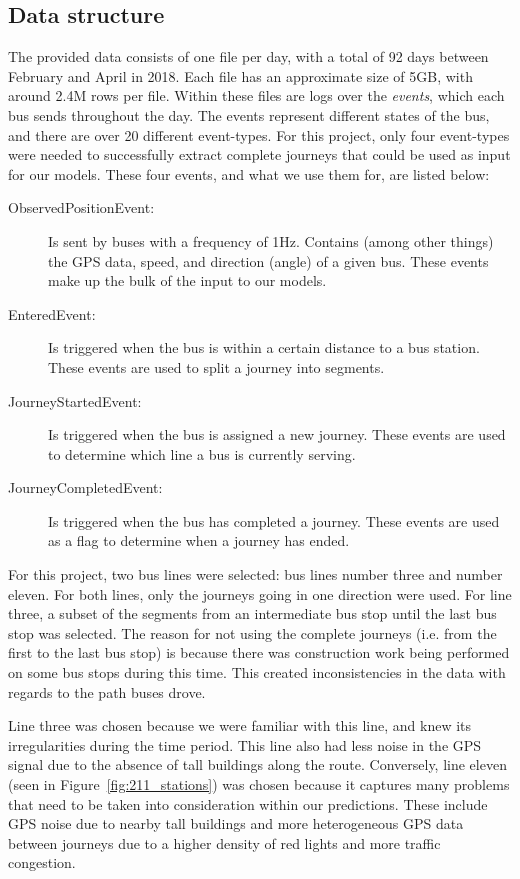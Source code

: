 \subsection{Data structure}
The provided data consists of one file per day, with a total of 92 days between February and April in 2018. Each file has an approximate size of 5GB, with around 2.4M rows per file. Within these files are logs over the \textit{events}, which each bus sends throughout the day. The events represent different states of the bus, and there are over 20 different event-types. For this project, only four event-types were needed to successfully extract complete journeys that could be used as input for our models. These four events, and what we use them for, are listed below:\\
\begin{description}
\item[ObservedPositionEvent:] Is sent by buses with a frequency of 1Hz. Contains (among other things) the GPS data, speed, and direction (angle) of a given bus. These events make up the bulk of the input to our models.
\item[EnteredEvent:] Is triggered when the bus is within a certain distance to a bus station. These events are used to split a journey into segments.
\item[JourneyStartedEvent:] Is triggered when the bus is assigned a new journey. These events are used to determine which line a bus is currently serving.
\item[JourneyCompletedEvent:] Is triggered when the bus has completed a journey. These events are used as a flag to determine when a journey has ended.
\end{description}

For this project, two bus lines were selected: bus lines number three and number eleven. For both lines, only the journeys going in one direction were used. For line three, a subset of the segments from an intermediate bus stop until the last bus stop was selected. The reason for not using the complete journeys (i.e. from the first to the last bus stop) is because there was construction work being performed on some bus stops during this time. This created inconsistencies in the data with regards to the path buses drove. 

Line three was chosen because we were familiar with this line, and knew its irregularities during the time period. This line also had less noise in the GPS signal due to the absence of tall buildings along the route. Conversely, line eleven (seen in Figure~\ref{fig:211_stations}) was chosen because it captures many problems that need to be taken into consideration within our predictions. These include GPS noise due to nearby tall buildings and more heterogeneous GPS data between journeys due to a higher density of red lights and more traffic congestion.

